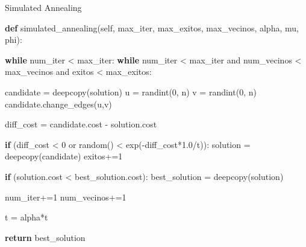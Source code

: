 \documentclass[ignorenonframetext,]{beamer}
\newenvironment{Shaded}{}{}
\newcommand{\KeywordTok}[1]{\textcolor[rgb]{0.00,0.44,0.13}{\textbf{{#1}}}}
\newcommand{\DecValTok}[1]{\textcolor[rgb]{0.25,0.63,0.44}{{#1}}}
\newcommand{\FloatTok}[1]{\textcolor[rgb]{0.25,0.63,0.44}{{#1}}}
\newcommand{\OtherTok}[1]{\textcolor[rgb]{0.00,0.44,0.13}{{#1}}}
\newcommand{\NormalTok}[1]{{#1}}
\begin{document}
\begin{frame}[fragile]{Simulated Annealing}

\begin{Shaded}
\begin{Highlighting}[]
\KeywordTok{def} \NormalTok{simulated_annealing(}\OtherTok{self}\NormalTok{, max_iter, max_exitos, max_vecinos, alpha, mu, phi):}
        
    \KeywordTok{while} \NormalTok{num_iter < max_iter:           }
        \KeywordTok{while} \NormalTok{num_iter < max_iter and num_vecinos < max_vecinos and exitos < max_exitos:}

            \NormalTok{candidate = deepcopy(solution)}
            \NormalTok{u = randint(}\DecValTok{0}\NormalTok{, n)}
            \NormalTok{v = randint(}\DecValTok{0}\NormalTok{, n)   }
            \NormalTok{candidate.change_edges(u,v)}

            \NormalTok{diff_cost = candidate.cost - solution.cost}

            \KeywordTok{if} \NormalTok{(diff_cost < }\DecValTok{0} \NormalTok{or random() < exp(-diff_cost*}\FloatTok{1.0}\NormalTok{/t)):}
                \NormalTok{solution = deepcopy(candidate)}
                \NormalTok{exitos+=}\DecValTok{1}

                \KeywordTok{if} \NormalTok{(solution.cost < best_solution.cost):}
                    \NormalTok{best_solution = deepcopy(solution)}

            \NormalTok{num_iter+=}\DecValTok{1}
            \NormalTok{num_vecinos+=}\DecValTok{1}

        \NormalTok{t = alpha*t}

    \KeywordTok{return} \NormalTok{best_solution}
    
\end{Highlighting}
\end{Shaded}

\end{frame}
\end{document}

